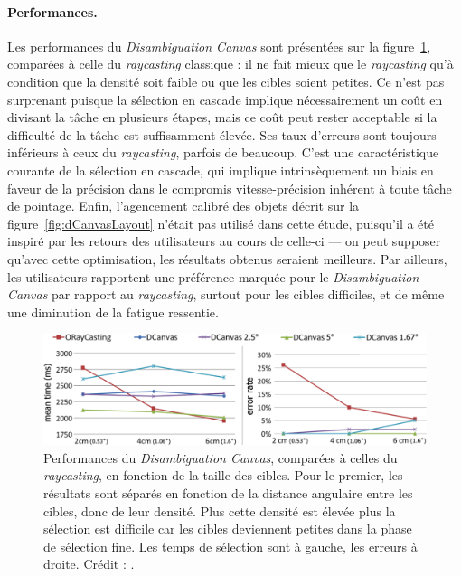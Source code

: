 	\paragraph{Performances.}
	Les performances du \emph{Disambiguation Canvas} sont présentées sur la figure~\ref{fig:dCanvasRCPerf}, comparées à celle du \emph{raycasting} classique : il ne fait mieux que le \emph{raycasting} qu'à condition que la densité soit faible ou que les cibles soient petites. Ce n'est pas surprenant puisque la sélection en cascade implique nécessairement un coût en divisant la tâche en plusieurs étapes, mais ce coût peut rester acceptable si la difficulté de la tâche est suffisamment élevée. Ses taux d'erreurs sont toujours inférieurs à ceux du \emph{raycasting}, parfois de beaucoup. C'est une caractéristique courante de la sélection en cascade, qui implique intrinsèquement un biais en faveur de la précision dans le compromis vitesse-précision inhérent à toute tâche de pointage. Enfin, l'agencement calibré des objets décrit sur la figure~\ref{fig:dCanvasLayout} n'était pas utilisé dans cette étude, puisqu'il a été inspiré par les retours des utilisateurs au cours de celle-ci --- on peut supposer qu'avec cette optimisation, les résultats obtenus seraient meilleurs. Par ailleurs, les utilisateurs rapportent une préférence marquée pour le \emph{Disambiguation Canvas} par rapport au \emph{raycasting}, surtout pour les cibles difficiles, et de même une diminution de la fatigue ressentie.
	
	\begin{figure}[htbp]
		\centering
		\includegraphics[width=\textwidth]{figures/ch2/dCanvasRCPerf}
		\caption[\emph{Disambiguation Canvas} -- performances I]{Performances du \emph{Disambiguation Canvas}, comparées à celles du \emph{raycasting}, en fonction de la taille des cibles. Pour le premier, les résultats sont séparés en fonction de la distance angulaire entre les cibles, donc de leur densité. Plus cette densité est élevée plus la sélection est difficile car les cibles deviennent petites dans la phase de sélection fine. Les temps de sélection sont à gauche, les erreurs à droite. Crédit : \cite{debarba2013disambiguation}.}
		\label{fig:dCanvasRCPerf}
	\end{figure}
	
